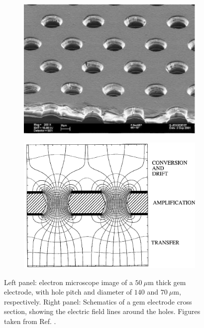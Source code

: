 \begin{figure}[t]
	\begin{subfigure}{0.49\textwidth}
		\centering
		\includegraphics[width=.90\linewidth]{Images/ND-GAr/GEM_photo.jpg}
	\end{subfigure}
	\begin{subfigure}{0.49\textwidth}
		\centering
		\includegraphics[width=.90\linewidth]{Images//ND-GAr/GEM_diagram.pdf}
	\end{subfigure}
	\caption[Electron microscope image and schematic diagram of a \gls{gem} electrode.]{Left panel: electron microscope image of a $50~\mu\mathrm{m}$ thick \gls{gem} electrode, with hole pitch and diameter of $140$ and $70~\mu\mathrm{m}$, respectively. Right panel: Schematics of a \gls{gem} electrode cross section, showing the electric field lines around the holes. Figures taken from Ref. \cite{Sauli2016}.}
	\label{fig:gem}
\end{figure}

